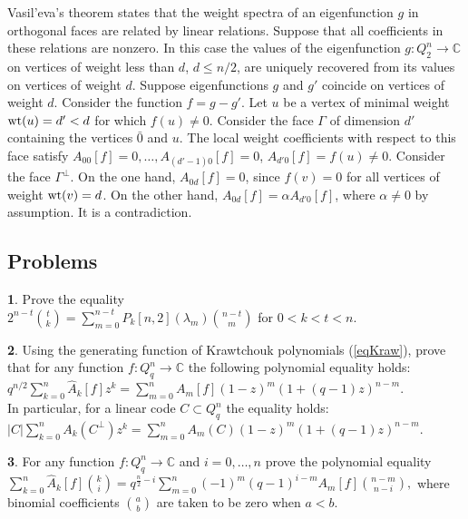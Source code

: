 \documentclass[11pt]{article}
\theoremstyle{definition}
\newtheorem{exercise}{\quad}
\newcommand{\wt}{{\rm wt}}
\begin{document}
{{{Vasil'eva's theorem states that the weight spectra of an eigenfunction $g$ in orthogonal faces are related by linear relations. Suppose that all coefficients in these relations are nonzero. In this case    the values of the eigenfunction $g:Q^n_2\rightarrow \mathbb{C}$ on vertices of weight less than 
$d$, $d\leq n/2$, are uniquely recovered from its values on vertices of weight $d$. Suppose eigenfunctions $g$ and $g'$ coincide on vertices of weight $d$. Consider the function $f=g-g'$. Let $u$ be a vertex of minimal weight $\wt(u)=d'<d$ for which $f(u)\neq 0$. Consider the face $\Gamma$ of dimension $d'$ containing the vertices $\bar 0$ and $u$. The local weight coefficients with respect  to this face satisfy $A_{00}[f]=0, \dots, A_{(d'-1)0}[f]=0$, $A_{d'0}[f]=f(u)\neq 0$. Consider the face $\Gamma^\perp$. On the one hand, $A_{0d}[f]=0$, since $f(v)=0$ for all vertices of weight $\wt(v)=d$. On the other hand, 
$A_{0d}[f]=\alpha A_{d'0}[f]$, where $\alpha\neq 0$ by assumption. It is a contradiction.


\subsection{Problems}


\begin{exercise}
Prove the equality \\ $2^{n-t}{t\choose k}=\sum\limits_{m=0}^{n-t}P_k[n,2](\lambda_m){n-t \choose m}$ for $0<k<t<n$.
\end{exercise}

\begin{exercise}
Using the generating function of Krawtchouk polynomials (\ref{eqKraw}), prove that for any function $f:Q^n_q\rightarrow \mathbb{C}$ the following polynomial equality holds:
$q^{n/2}\sum\limits_{k=0}^n\widehat{A}_k[f]z^k=\sum\limits_{m=0}^n A_m[f](1-z)^m(1+(q-1)z)^{n-m}.$ \\
In particular, for a linear code $C\subset Q^n_q$ the equality holds:\\
$|C|\sum\limits_{k=0}^nA_k({C^\perp})z^k=\sum\limits_{m=0}^n A_m(C)(1-z)^m(1+(q-1)z)^{n-m}.$
\end{exercise}

\begin{exercise}
For any function $f:Q^n_q\rightarrow \mathbb{C}$ and $i=0,\dots,n$ prove the polynomial equality\\
$\sum\limits_{k=0}^n\widehat{A}_k[f]{k\choose i}=q^{\frac{n}{2}-i}\sum\limits_{m=0}^n(-1)^m(q-1)^{i-m}A_m[f]{n-m\choose n-i},$ where binomial coefficients ${a \choose b}$ are taken to be zero when $a<b$.
\end{exercise}

}}}
\end{document}
